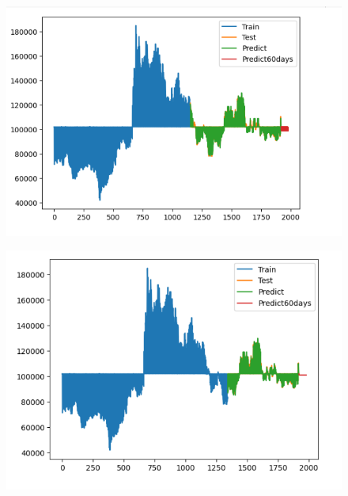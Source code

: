 \documentclass{article}
\begin{document}
\begin{multicols}{2}
\begin{figure}[H]
    \centering
    \begin{minipage}{0.15\textwidth}
    \centering
    \includegraphics[width=1\textwidth]{Image/GradientBoosting/LG_60_6_4_GradientBoostingRegressor.png}
   
    \label{fig:1}
    \end{minipage}%
    \begin{minipage}{0.15\textwidth}
    \centering
    \includegraphics[width=1\textwidth]{Image/GradientBoosting/LG_60_7_3_GradientBoostingRegressor.png}
  

\end{minipage}
\end{figure}
\end{multicols}
\end{document}
